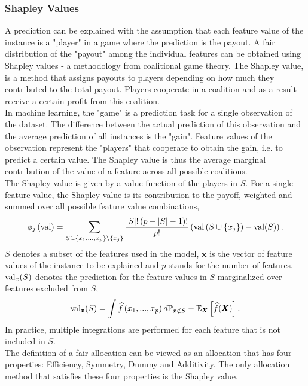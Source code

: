 \subsubsection*{Shapley Values}
A prediction can be explained with the assumption that each feature value of the instance is a "player" in a game where the prediction is the payout. A fair distribution of the "payout" among the individual features can be obtained using Shapley values - a methodology from coalitional game theory. The Shapley value, is a method that assigns payouts to players depending on how much they contributed to the total payout. Players cooperate in a coalition and as a result receive a certain profit from this coalition. \\
In machine learning, the "game" is a prediction task for a single observation of the dataset. The difference between the actual prediction of this observation and the average prediction of all instances is the "gain". Feature values of the observation represent the "players" that cooperate to obtain the gain, i.e. to predict a certain value. The Shapley value is thus the average marginal contribution of the value of a feature across all possible coalitions. \\
The Shapley value is given by a value function of the players in $S$. For a single feature value, the Shapley value is its contribution to the payoff, weighted and summed over all possible feature value combinations,
\begin{equation}
    \phi_j\left(\hbox{val}\right)=\sum_{S\subseteq \lbrace x_1,...,x_p\rbrace\setminus \lbrace x_j\rbrace}\frac{\left|S\right|!\left(p-\left|S\right|-1\right)!}{p!}\left(\hbox{val}\left(S\cup\lbrace x_j\rbrace\right)-\hbox{val}(S)\right).
\end{equation}
$S$ denotes a subset of the features used in the model, $\pmb{x}$ is the vector of feature values of the instance to be explained and $p$ stands for the number of features. $\hbox{val}_x(S)$ denotes the prediction for the feature values in $S$ marginalized over features excluded from $S$,
\begin{equation}
    \hbox{val}_{\pmb{x}}(S)=\int\widehat{f}\left(x_1,...,x_p\right)d\mathbb{P}_{\pmb{x}\notin S} - \mathbb{E}_{\pmb{X}}\left[\widehat{f}(\pmb{X})\right].
\end{equation}
In practice, multiple integrations are performed for each feature that is not included in $S$. \\
The definition of a fair allocation can be viewed as an allocation that has four properties: Efficiency, Symmetry, Dummy and Additivity. The only allocation method that satisfies these four properties is the Shapley value. \\
